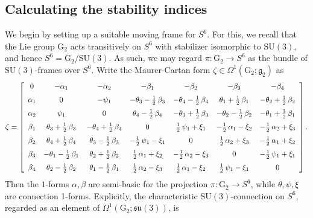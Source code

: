 \documentclass[11pt]{article}
\newcommand{\SU}{\mathrm{SU}}
\newcommand{\G}{\mathrm{G}}
\theoremstyle{definition}
\numberwithin{equation}{section}
\begin{document}
\subsection{Calculating the stability indices}

\indent \indent We begin by setting up a suitable moving frame for $S^6$.  For this, we recall that the Lie group $\G_2$ acts transitively on $S^6$ with stabilizer isomorphic to $\SU(3)$, and hence $S^6 = \G_2/\SU(3)$.  As such, we may regard $\pi \colon \G_2 \to S^6$ as the bundle of $\SU(3)$-frames over $S^6$.  Write the Maurer-Cartan form $\zeta \in \Omega^1(\G_2; \mathfrak{g}_2)$ as
\begin{equation*}
\zeta =    \left[ \begin {array}{ccccccc} 0&-\alpha_{{1}}&-\alpha_{{2}}&-\beta_{
{1}}&-\beta_{{2}}&-\beta_{{3}}&-\beta_{{4}}\\ \noalign{\medskip}\alpha
_{{1}}&0&-\psi_{{1}}&-\theta_{{3}}-\tfrac{1}{2}\,\beta_{{3}}&-\theta_{{4}}-\tfrac{1}{2}
\,\beta_{{4}}&\theta_{{1}}+\tfrac{1}{2}\,\beta_{{1}}&-\theta_{{2}}+\tfrac{1}{2}\,\beta_{
{2}}\\ \noalign{\medskip}\alpha_{{2}}&\psi_{{1}}&0&\theta_{{4}}-\tfrac{1}{2}\,
\beta_{{4}}&-\theta_{{3}}+\tfrac{1}{2}\,\beta_{{3}}&-\theta_{{2}}-\tfrac{1}{2}\,\beta_{{
2}}&-\theta_{{1}}+\tfrac{1}{2}\,\beta_{{1}}\\ \noalign{\medskip}\beta_{{1}}&
\theta_{{3}}+\tfrac{1}{2}\,\beta_{{3}}&-\theta_{{4}}+\tfrac{1}{2}\,\beta_{{4}}&0&\tfrac{1}{2}\,
\psi_{{1}}+\xi_{{1}}&-\tfrac{1}{2}\,\alpha_{{1}}-\xi_{{2}}&-\tfrac{1}{2}\,\alpha_{{2}}+
\xi_{{3}}\\ \noalign{\medskip}\beta_{{2}}&\theta_{{4}}+\tfrac{1}{2}\,\beta_{{4}
}&\theta_{{3}}-\tfrac{1}{2}\,\beta_{{3}}&-\tfrac{1}{2}\,\psi_{{1}}-\xi_{{1}}&0&\tfrac{1}{2}\,
\alpha_{{2}}+\xi_{{3}}&-\tfrac{1}{2}\,\alpha_{{1}}+\xi_{{2}}
\\ \noalign{\medskip}\beta_{{3}}&-\theta_{{1}}-\tfrac{1}{2}\,\beta_{{1}}&\theta
_{{2}}+\tfrac{1}{2}\,\beta_{{2}}&\tfrac{1}{2}\,\alpha_{{1}}+\xi_{{2}}&-\tfrac{1}{2}\,\alpha_{{2}}
-\xi_{{3}}&0&-\tfrac{1}{2}\,\psi_{{1}}+\xi_{{1}}\\ \noalign{\medskip}\beta_{{4}
}&\theta_{{2}}-\tfrac{1}{2}\,\beta_{{2}}&\theta_{{1}}-\tfrac{1}{2}\,\beta_{{1}}&\tfrac{1}{2}\,
\alpha_{{2}}-\xi_{{3}}&\tfrac{1}{2}\,\alpha_{{1}}-\xi_{{2}}&\tfrac{1}{2}\,\psi_{{1}}-\xi
_{{1}}&0\end {array} \right].
\end{equation*}
Then the $1$-forms $\alpha, \beta$ are semi-basic for the projection $\pi \colon \G_2 \to S^6$, while $\theta, \psi, \xi$ are connection 1-forms. Explicitly, the characteristic $\SU(3)$-connection on $S^6$, regarded as an element of $\Omega^1(\G_2; \mathfrak{su}(3))$, is
\end{document}
